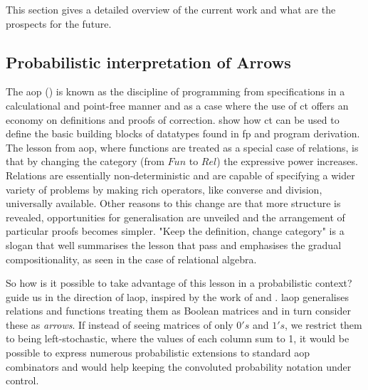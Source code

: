 \documentclass[
  oneside,
  11pt, a4paper,
  footinclude=true,
  headinclude=true,
  cleardoublepage=empty
]{scrbook}
\theoremstyle{definition}
\theoremstyle{definition}
\begin{document}
	    This section gives a detailed overview of the current work and what are the prospects for the future.
	
	    \subsection{Probabilistic interpretation of Arrows}
	    
	        The \gls{aop} (\cite{Bird:1997:AP:248932}) is known as the discipline of programming from specifications in a calculational and point-free manner and as a case where the use of \gls{ct} offers an economy on definitions and proofs of correction. \cite{Bird:1997:AP:248932} show how \gls{ct} can be used to define the basic building blocks of datatypes found in \gls{fp} and program derivation. The lesson from \gls{aop}, where functions are treated as a special case of relations, is that by changing the category (from $Fun$ to $Rel$) the expressive power increases. Relations are essentially non-deterministic and are capable of specifying a wider variety of problems by making rich operators, like converse and division, universally available. Other reasons to this change are that more structure is revealed, opportunities for generalisation are unveiled and the arrangement of particular proofs becomes simpler. "Keep the definition, change category" is a slogan that well summarises the lesson that \cite{Bird:1997:AP:248932} pass and emphasises the gradual compositionality, as seen in the case of relational algebra.
	        
	        So how is it possible to take advantage of this lesson in a probabilistic context? \cite{Oliveira2016KeepDC} guide us in the direction of \gls{laop}, inspired by the work of \cite{Macedo2012MatricesAA} and \cite{oliveira2012towards}. \gls{laop} generalises relations and functions treating them as Boolean matrices and in turn consider these as \emph{arrows}. If instead of seeing matrices of only $0's$ and $1's$, we restrict them to being left-stochastic, where the values of each column sum to 1, it would be possible to express numerous probabilistic extensions to standard \gls{aop} combinators and would help keeping the convoluted probability notation under control.
	        
\end{document}
